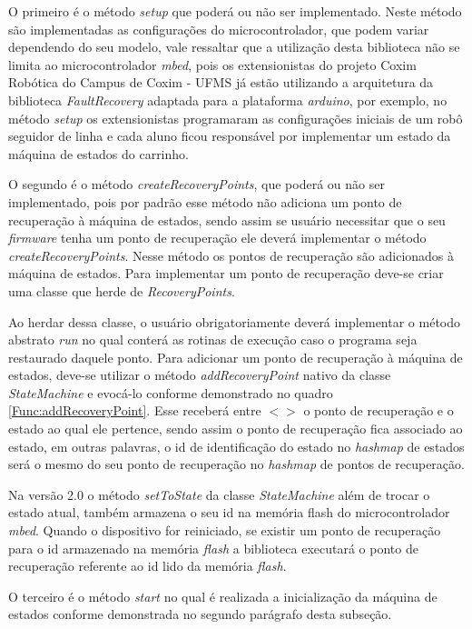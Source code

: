 O primeiro é o método \textit{setup} que poderá ou não ser implementado. Neste método são implementadas as configurações do microcontrolador, que podem variar dependendo do seu modelo, vale ressaltar que a utilização desta biblioteca não se limita ao microcontrolador \textit{mbed}, pois os extensionistas do projeto Coxim Robótica do Campus de Coxim - UFMS já estão utilizando a arquitetura da biblioteca \textit{FaultRecovery} adaptada para a plataforma \textit{arduino}, por exemplo, no método \textit{setup} os extensionistas programaram as configurações iniciais de um robô seguidor de linha e cada aluno ficou responsável por implementar um estado da máquina de estados do carrinho.

O segundo é o método \textit{createRecoveryPoints}, que poderá ou não ser implementado, pois por padrão esse método não adiciona um ponto de recuperação à máquina de estados, sendo assim se usuário necessitar que o seu \textit{firmware} tenha um ponto de recuperação ele deverá implementar o método \textit{createRecoveryPoints}. Nesse método os pontos de recuperação são adicionados à máquina de estados. Para implementar um ponto de recuperação deve-se criar uma classe que herde de \textit{RecoveryPoints}. 

Ao herdar dessa classe, o usuário obrigatoriamente deverá implementar o método abstrato \textit{run} no qual conterá as rotinas de execução caso o programa seja restaurado daquele ponto. Para adicionar um ponto de recuperação à máquina de estados, deve-se utilizar o método \textit{addRecoveryPoint} nativo da classe \textit{StateMachine} e evocá-lo conforme demonstrado no quadro \autoref{Func:addRecoveryPoint}. Esse receberá entre $< >$ o ponto de recuperação e o estado ao qual ele pertence, sendo assim o ponto de recuperação fica associado ao estado, em outras palavras, o id de identificação do estado no \textit{hashmap} de estados será o mesmo do seu ponto de recuperação no \textit{hashmap} de pontos de recuperação.

Na versão 2.0 o método \textit{setToState} da classe \textit{StateMachine} além de trocar o estado atual, também armazena o seu id na memória flash do microcontrolador \textit{mbed}. Quando o dispositivo for reiniciado, se existir um ponto de recuperação para o id armazenado na memória \textit{flash} a biblioteca executará o ponto de recuperação referente ao id lido da memória \textit{flash}.

O terceiro é o método \textit{start} no qual é realizada a inicialização da máquina de estados conforme demonstrada no segundo parágrafo desta subseção.

